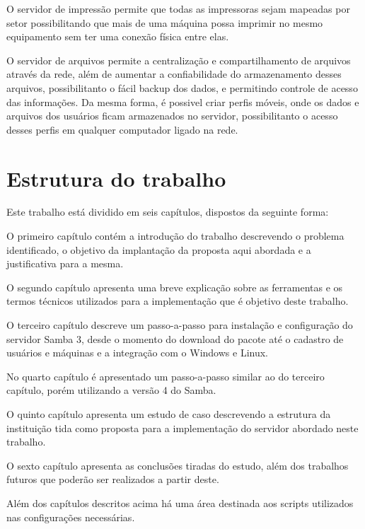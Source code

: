O servidor de impressão permite que todas as impressoras sejam mapeadas por setor possibilitando que mais de uma máquina possa imprimir no mesmo equipamento sem ter uma conexão física entre elas.

O servidor de arquivos permite a centralização e compartilhamento de arquivos através da rede, além de aumentar a confiabilidade do armazenamento desses arquivos, possibilitanto o fácil backup dos dados, e permitindo controle de acesso das informações. Da mesma forma, é possivel criar perfis móveis, onde os dados e arquivos dos usuários ficam armazenados no servidor, possibilitanto o acesso desses perfis em qualquer computador ligado na rede.

\section{Estrutura do trabalho}

Este trabalho está dividido em seis capítulos, dispostos da seguinte forma:

O primeiro capítulo contém a introdução do trabalho descrevendo o problema identificado, o objetivo da implantação da proposta aqui abordada e a justificativa para a mesma.

O segundo capítulo apresenta uma breve explicação sobre as ferramentas e os termos técnicos utilizados para a implementação que é objetivo deste trabalho. 

O terceiro capítulo descreve um passo-a-passo para instalação e configuração do servidor Samba 3, desde o momento do download do pacote até o cadastro de usuários e máquinas e a integração com o Windows e Linux.

No quarto capítulo é apresentado um passo-a-passo similar ao do terceiro capítulo, porém utilizando a versão 4 do Samba.

O quinto capítulo apresenta um estudo de caso descrevendo a estrutura da instituição tida como proposta para a implementação do servidor abordado neste trabalho.

O sexto capítulo apresenta as conclusões tiradas do estudo, além dos trabalhos futuros que poderão ser realizados a partir deste.

Além dos capítulos descritos acima há uma área destinada aos scripts utilizados nas configurações necessárias.